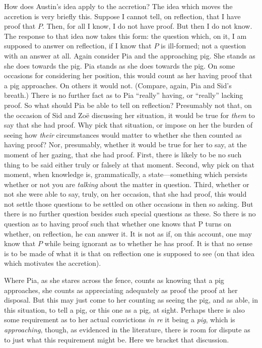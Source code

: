 How does Austin's idea apply to the accretion? The idea which moves the accretion is very briefly this. Suppose I cannot tell, on reflection, that I have proof that \( P \). Then, for all I know, I do not have proof. But then I do not know. The response to that idea now takes this form: the question which, on it, I am supposed to answer on reflection, if I know that \( P \) is ill-formed; not a question with an answer at all. Again consider Pia and the approaching pig. She stands as she does towards the pig. Pia stands as she does towards the pig. On some occasions for considering her position, this would count as her having proof that a pig approaches. On others it would not. (Compare, again, Pia and Sid's breath.) There is no further fact as to Pia ``really'' having, or ``really'' lacking proof. So what should Pia be able to tell on reflection? Presumably not that, on the occasion of Sid and Zoë discussing her situation, it would be true for \emph{them} to say that she had proof. Why pick that situation, or impose on her the burden of seeing how \emph{their} circumstances would matter to whether she then counted as having proof? Nor, presumably, whether it would be true for her to say, at the moment of her gazing, that she had proof. First, there is likely to be no such thing to be said either truly or falsely at that moment. Second, why pick on that moment, when knowledge is, grammatically, a state---something which persists whether or not you are \emph{talking} about the matter in question. Third, whether or not she were able to say, truly, on her occasion, that she had proof, this would not settle those questions to be settled on other occasions in then so asking. But there is no further question besides such special questions as these. So there is no question as to having proof such that whether one knows that P turns on whether, on reflection, he can answer it. It is not as if, on this account, one may know that \( P \) while being ignorant as to whether he has proof. It is that no sense is to be made of what it is that on reflection one is supposed to see (on that idea which motivates the accretion).

Where Pia, as she stares across the fence, counts as knowing that a pig approaches, she counts as appreciating adequately as proof the proof at her disposal. But this may just come to her counting as seeing the pig, and as able, in this situation, to tell a pig, or this one as a pig, at sight. Perhaps there is also some requirement as to her actual convictions \emph{in re} it being a \emph{pig}, which is \emph{approaching}, though, as evidenced in the literature, there is room for dispute as to just what this requirement might be. Here we bracket that discussion.

